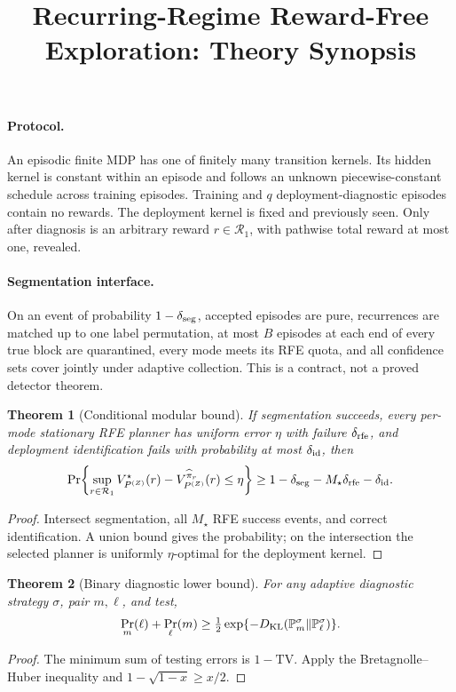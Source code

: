 \documentclass[11pt]{article}
\title{Recurring-Regime Reward-Free Exploration: Theory Synopsis}
\date{}
\newtheorem{theorem}{Theorem}
\newcommand{\cR}{\mathcal R_1}
\begin{document}
\maketitle

\paragraph{Protocol.}
An episodic finite MDP has one of finitely many transition kernels.  Its hidden
kernel is constant within an episode and follows an unknown piecewise-constant
schedule across training episodes.  Training and \(q\) deployment-diagnostic
episodes contain no rewards.  The deployment kernel is fixed and previously
seen.  Only after diagnosis is an arbitrary reward \(r\in\cR\), with pathwise
total reward at most one, revealed.

\paragraph{Segmentation interface.}
On an event of probability \(1-\delta_{\rm seg}\), accepted episodes are pure,
recurrences are matched up to one label permutation, at most \(B\) episodes
at each end of every true block are quarantined, every mode meets its RFE
quota, and all confidence sets cover jointly under adaptive collection.
This is a contract, not a proved detector theorem.

\begin{theorem}[Conditional modular bound]
If segmentation succeeds, every per-mode stationary RFE planner has uniform
error \(\eta\) with failure \(\delta_{\rm rfe}\), and deployment
identification fails with probability at most \(\delta_{\rm id}\), then
\[
\Pr\!\left\{\sup_{r\in\cR}
V_{P^{(Z)}}^\star(r)-V_{P^{(Z)}}^{\widehat\pi_r}(r)\le\eta\right\}
\ge1-\delta_{\rm seg}-M_\star\delta_{\rm rfe}-\delta_{\rm id}.
\]
\end{theorem}
\begin{proof}
Intersect segmentation, all \(M_\star\) RFE success events, and correct
identification.  A union bound gives the probability; on the intersection the
selected planner is uniformly \(\eta\)-optimal for the deployment kernel.
\end{proof}

\begin{theorem}[Binary diagnostic lower bound]
For any adaptive diagnostic strategy \(\sigma\), pair \(m,\ell\), and test,
\[
\Pr_m(\ell)+\Pr_\ell(m)\ge
\tfrac12\exp\{-D_{\rm KL}(\mathbb P_m^\sigma\Vert
\mathbb P_\ell^\sigma)\}.
\]
\end{theorem}
\begin{proof}
The minimum sum of testing errors is \(1-\mathrm{TV}\).  Apply the
Bretagnolle--Huber inequality and
\(1-\sqrt{1-x}\ge x/2\).
\end{proof}
\end{document}
